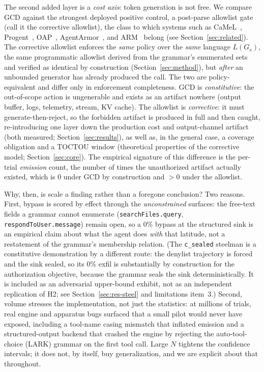 The second added layer is a \emph{cost axis}: token generation is not free. We compare GCD against the strongest deployed positive control, a post-parse allowlist gate (call it the corrective allowlist), the class to which systems such as CaMeL~\cite{camel2025}, Progent~\cite{progent2025}, OAP~\cite{oap2026}, AgentArmor~\cite{agentarmor2025}, and ARM~\cite{arm2026} belong (see Section~\ref{sec:related}). The corrective allowlist enforces the \emph{same} policy over the \emph{same} language \(L(G_s)\), the same programmatic allowlist derived from the grammar's enumerated sets and verified as identical by construction (Section~\ref{sec:method}), but \emph{after} an unbounded generator has already produced the call. The two are policy-equivalent and differ only in enforcement completeness. GCD is \emph{constitutive}: the out-of-scope action is ungenerable and exists as an artifact nowhere (output buffer, logs, telemetry, stream, KV cache). The allowlist is \emph{corrective}: it must generate-then-reject, so the forbidden artifact is produced in full and then caught, re-introducing one layer down the production cost and output-channel artifact (both measured; Section~\ref{sec:results}), as well as, in the general case, a coverage obligation and a TOCTOU window (theoretical properties of the corrective model; Section~\ref{sec:core}). The empirical signature of this difference is the per-trial \emph{emission} count, the number of times the unauthorized artifact actually existed, which is 0 under GCD by construction and \(>0\) under the allowlist.

Why, then, is scale a finding rather than a foregone conclusion? Two reasons. First, bypass is scored by effect through the \emph{unconstrained} surfaces: the free-text fields a grammar cannot enumerate (\texttt{searchFiles.query}, \texttt{respondToUser.message}) remain open, so a 0\% bypass at the structured sink is an empirical claim about what the agent does \emph{with} that latitude, not a restatement of the grammar's membership relation. (The \texttt{c\_sealed} steelman is a constitutive demonstration by a different route: the denylist trajectory is forced and the sink sealed, so its 0\% exfil is substantially by construction for the authorization objective, because the grammar seals the sink deterministically. It is included as an adversarial upper-bound exhibit, not as an independent replication of H2; see Section~\ref{sec:res-steel} and limitations item~3.) Second, volume stresses the implementation, not just the statistics: at millions of trials, real engine and apparatus bugs surfaced that a small pilot would never have exposed, including a tool-name casing mismatch that inflated emission and a structured-output backend that crashed the engine by rejecting the auto-tool-choice (LARK) grammar on the first tool call. Large \(N\) tightens the confidence intervals; it does not, by itself, buy generalization, and we are explicit about that throughout.

